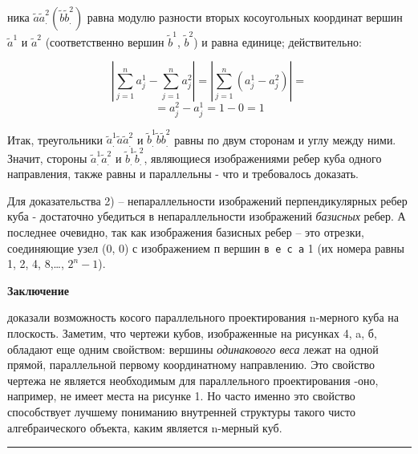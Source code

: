 \documentclass[main.tex]{subfiles}
\begin{document}
{
    \begin{multicols}{2}
    
    \noindent ника $\tilde a  \tilde a^2_. (\tilde b  \tilde b^2_.)$ равна модулю разности вторых косоугольных координат вершин $\tilde a^1$ и $\tilde a^2$ (соответственно вершин $\tilde b^1$, $\tilde b^2$) и равна единице; действительно:

    \[\left|\sum_{j=1}^{n}a_{j}^{1} - \sum_{j=1}^{n}a_{j}^{2}\right| = \left|\sum_{j=1}^{n}(a_{j}^{1} - a_{j}^{2})\right|=\]
    \[=a_{j}^{2} - a_{j}^{1} = 1 - 0 = 1\]
    
    Итак, треугольники $\tilde a^1_. \tilde a \tilde a^2_.$ и $\tilde b^1_. \tilde b \tilde b^2_.$ равны по двум сторонам и углу между ними. Значит, стороны $\tilde a^1_.\tilde a^2_.$ и $\tilde b^1_.\tilde b^2_.$, являющиеся изображениями ребер куба одного направления, также равны и параллельны - что и требовалось доказать.
    
    Для доказательства  2) -- непараллельности изображений перпендикулярных ребер куба - достаточно убедиться в непараллельности изображений \textit{базисных} ребер. А последнее очевидно, так как изображения базисных ребер -- это отрезки, соединяющие узел (0, 0) с изображением п вершин \texttt{в е с а} 1 (их номера равны 1, 2, 4, 8,…, $2^n - 1$).
    
   \vspace{4mm}
   
   \noindent\textbf{Заключение}

    доказали возможность косого параллельного проектирования n-мерного куба на плоскость. Заметим, что чертежи кубов, изображенные на рисунках 4, a, б, обладают еще одним свойством: вершины \textit{одинакового веса} лежат на одной прямой, параллельной первому координатному направлению. Это свойство чертежа не является необходимым для параллельного проектирования -оно, например, не имеет места на рисунке 1. Но часто именно это свойство способствует лучшему пониманию внутренней структуры такого чисто алгебраического объекта, каким является n-мерный куб.

    \end{multicols}
}

\vspace{1cm}

\hrule

\vspace{1cm}
\end{document}
